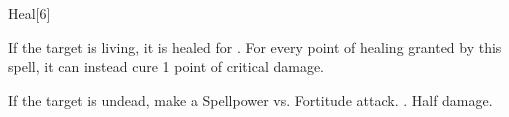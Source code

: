 \begin{spellsection}{Heal}[6]
    \begin{spellheader}
    \end{spellheader}
    \begin{spellcontent}
        \begin{spelltargetinginfo}
        \end{spelltargetinginfo}
        \begin{spelleffects}
            \spelleffect If the target is living, it is healed for \spelldamage{}. For every point of healing granted by this spell, it can instead cure 1 point of critical damage.
            \begin{spellattacktriggered}{If the target is undead, make a Spellpower vs. Fortitude attack.}
                \spellsuccess {}.
                \spellfailure Half damage.
            \end{spellattacktriggered}
        \end{spelleffects}
    \end{spellcontent}
    \begin{spellfooter}
        \miscastrandom
    \end{spellfooter}
\end{spellsection}

